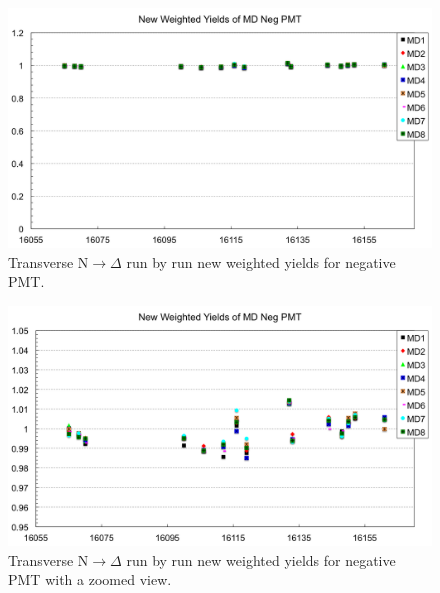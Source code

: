 \begin{figure}[!h]
	\begin{center}
	\includegraphics[width=15.0cm]{figures/transverseN2DeltaRunByRunWeightedYieldsNegPMT_UnZoomed}
	\end{center}
	\caption
	{Transverse N$\rightarrow\Delta$ run by run new weighted yields for negative PMT.}
	\label{fig:transverseN2DeltaRunByRunWeightedYieldsNegPMT_UnZoomed}
\end{figure}

\begin{figure}[!h]
	\begin{center}
	\includegraphics[width=15.0cm]{figures/transverseN2DeltaRunByRunWeightedYieldsNegPMT}
	\end{center}
	\caption
	{Transverse N$\rightarrow\Delta$ run by run new weighted yields for negative PMT with a zoomed view.}
	\label{fig:transverseN2DeltaRunByRunWeightedYieldsNegPMT}
\end{figure}

